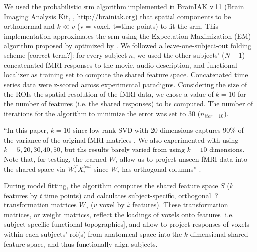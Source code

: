 

We used the probabilistic \ac{srm} algorithm implemented in BrainIAK v.11 (Brain
Imaging Analysis Kit, \citet{kumar2020brainiak, kumar2020brainiaktutorial},
http://brainiak.org) that spatial components to be orthonormal and $k\ll v$ (v
= voxel, t=time-points) to fit the \ac{srm}.
%
This implementation approximates the \ac{srm} using the Expectation Maximization
(EM) algorithm proposed by \citep{chen2015reduced} optimized by
\citet{anderson2016enabling}.
%
We followed a leave-one-subject-out folding scheme [correct term?]:
%
for every subject $n$, we used the other subjects' ($N-1$) concatenated fMRI
responses to the movie, audio-description, and functional localizer as training
set to compute the shared feature space.
%
Concatenated time series data were z-scored across experimental
paradigms.
Considering the size of the ROIs the spatial resolution of the fMRI data, we
chose a value of $k=10$ for the number of features (i.e. the shared responses)
to be computed.
The number of iterations for the algorithm to minimize the error was set to 30
($n_{iter=10}$).


``In this paper, $k=10$ since low-rank SVD with 20 dimensions captures 90\% of
the variance of the original fMRI matrices \citep{chen2015reduced}. We also
experimented with using $k=5,20,30,40,50$, but the results barely varied from
using $k=10$ dimensions.  Note that, for testing, the learned $W_{i}$ allow us
to project unseen fMRI data into the shared space via $W_{i}^{T}X_{i}^{test}$
since $W_{i}$ has orthogonal columns'' \citep{vodrahalli2018mapping}.

%
During model fitting, the algorithm computes the shared feature space $S$ ($k$
features by $t$ time points) and calculates subject-specific, orthogonal [?]
transformation matrices $W_{n}$ ($v$ voxel by $k$ features).
%
These transformation matrices, or weight matrices, reflect the loadings of
voxels onto features [i.e. subject-specific functional topographies], and allow
to project responses of voxels within each subjects' \ac{roi}(s) from anatomical
space into the $k$-dimensional shared feature space, and thus functionally align
subjects.

